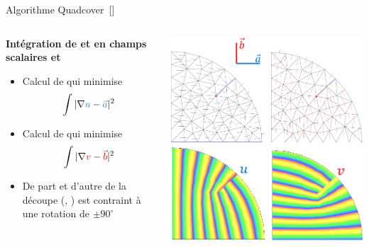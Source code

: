 \begin{frame}{Algorithme Quadcover~[\cite{kalberer_quadcover_2007}]}
    \begin{columns}
        \begin{column}{0.5\textwidth}
            \textbf{Intégration de  et  en champs scalaires  et  }
            \begin{itemize}
                \item Calcul de  qui minimise \[\int{ |\nabla{\blue{u}} - \blue{\vec{a}}|^2 }\]
                \item Calcul de  qui minimise \[\int{ |\nabla{{\color{red}v}} - {\color{red}\vec{b}}|^2 }\]
                \item De part et d'autre de la découpe (, ) est contraint à une rotation de $\pm 90^\circ$ 
            \end{itemize}
        \end{column}
        
        \begin{column}{0.5\textwidth}
            \centering
            \includegraphics[width=\linewidth]{img/new_images/vf_to_sf.png}
        \end{column}
    \end{columns}
\end{frame}




